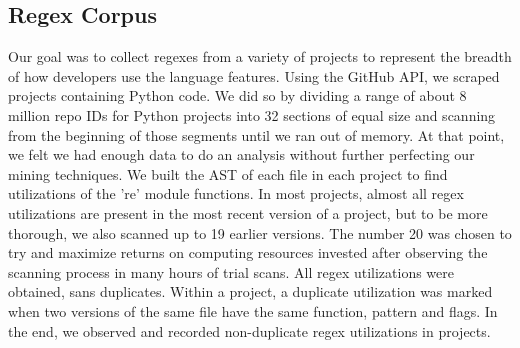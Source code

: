 \subsection{Regex Corpus}
\label{study:corpus}
Our goal was to collect regexes from a variety of projects to represent the breadth of how developers use the language features.
Using the GitHub API, we scraped   projects containing Python code.
We did so  by dividing a range of about 8 million repo IDs for Python projects
into 32 sections of equal size and scanning from the beginning of those
segments until we ran out of memory. At that point, we felt we had enough data
to do an analysis without further perfecting our mining techniques. We built
the AST of each file in each project to find utilizations of the 're' module
functions. In most projects, almost all regex utilizations are present in the
most recent version of a project, but to be more thorough, we also scanned up
to 19 earlier versions. The number 20 was chosen to try and maximize returns on
computing resources invested after observing the scanning process in many hours
of trial scans.
All regex utilizations were obtained, sans duplicates. Within a project, a duplicate utilization was marked when two versions of the same file have the same function, pattern and flags.  In the end, we observed and recorded  non-duplicate regex utilizations in  projects.

